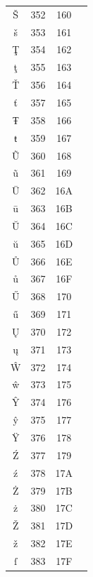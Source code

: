 ﻿\documentclass[10pt]{article}
\begin{document}
\begin{tabular}{crcl}
Š&352&160&\\
š&353&161&\\
Ţ&354&162&\\
ţ&355&163&\\
Ť&356&164&\\
ť&357&165&\\
Ŧ&358&166&\\
ŧ&359&167&\\
Ũ&360&168&\\
ũ&361&169&\\
Ū&362&16A&\\
ū&363&16B&\\
Ŭ&364&16C&\\
ŭ&365&16D&\\
Ů&366&16E&\\
ů&367&16F&\\
Ű&368&170&\\
ű&369&171&\\
Ų&370&172&\\
ų&371&173&\\
Ŵ&372&174&\\
ŵ&373&175&\\
Ŷ&374&176&\\
ŷ&375&177&\\
Ÿ&376&178&\\
Ź&377&179&\\
ź&378&17A&\\
Ż&379&17B&\\
ż&380&17C&\\
Ž&381&17D&\\
ž&382&17E&\\
ſ&383&17F&\\
\end{tabular}
\end{document}
